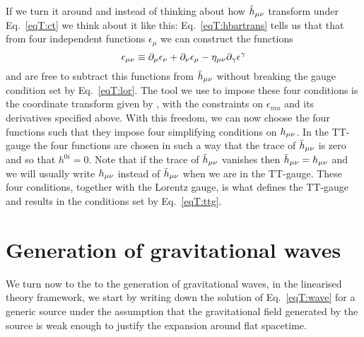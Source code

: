 If we turn it around and instead of thinking about how $\bar{h}_{\mu\nu}$ transform under Eq.~\ref{eqT:ct}
we think about it like this: Eq.~\ref{eqT:hbartrans} tells us that
that from four independent functions $\epsilon_{\mu}$ we can construct the functions 
\begin{equation}
\epsilon_{\mu\nu} \equiv \partial_{\mu} \epsilon_{\nu} + \partial_{\nu} \epsilon_{\mu} - \eta_{\mu\nu}\partial_{\gamma} \epsilon^{\gamma}
\end{equation}
and are free to subtract this functions from $\bar{h}_{\mu\nu}$ without breaking the gauge condition set by Eq.~\ref{eqT:lor}.
The tool we use to impose these four conditions is the coordinate transform given by , with the constraints
on $\epsilon_{mu}$ and its derivatives specified above.
With this freedom, we can now choose the four functions such that they impose four simplifying conditions on  $h_{\mu\nu}$.
In the TT-gauge the four functions are chosen in such a way that the trace of $\bar{h}_{\mu\nu}$ is zero and
so that $h^{0i} = 0$. Note that if the trace of $\bar{h}_{\mu\nu}$ vanishes then $\bar{h}_{\mu\nu} = h_{\mu\nu}$ and
we will usually write $h_{\mu\nu}$ instead of $\bar{h}_{\mu\nu}$ when we are in the TT-gauge.
These four conditions, together with the Lorentz gauge, is what defines the TT-gauge and results in the
conditions set by Eq.~\ref{eqT:ttg}.

\section{Generation of gravitational waves}
We turn now to the to the generation of gravitational waves, in the linearised theory framework,
we start by writing down the solution of Eq.~\ref{eqT:wave} for a generic source under the assumption that the gravitational field generated by the source is weak enough to justify the expansion around flat spacetime. 

